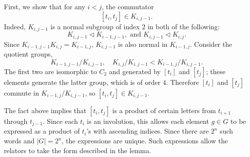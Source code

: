 \documentclass[12pt,leqno]{amsart}
\makeatletter
\renewenvironment{proof}[1][\proofname]{%
	\par
	\pushQED{\qed}%
	\normalfont
	\topsep6\p@\@plus6\p@\relax
	\trivlist
	\item[\hskip\labelsep\itshape #1\@addpunct{.}]%
	\ignorespaces
}{%
	\par\nobreak\vspace{2pt}%
	\popQED%
	\medskip%
	\endtrivlist
	\@endpefalse
}
\newcommand{\2}{L^2_{\rm per}(0, T)}
\numberwithin{equation}{section}
\numberwithin{figure}{section}
\makeatother
\begin{document}
\begin{proof}
    First, we show that for any $i<j$, the commutator
    \[
    [t_i,t_j]\in K_{i,j-1}.
    \]
    Indeed, $K_{i,j-1}$ is a normal subgroup of index $2$ in both of the following:
    \[
    K_{i,j-1}\vartriangleleft K_{i-1,j-1},\text{ and }K_{i,j-1}\vartriangleleft K_{i,j}.
    \]
    Since $K_{i-1,j-1}K_{i,j} = K_{i-1,j}$, $K_{i,j-1}$ is also normal in $K_{i-1,j}$. Consider the quotient groups,
    \[
    K_{i-1,j-1}/K_{i,j-1}, \quad K_{i,j}/K_{i,j-1}<K_{i-1,j}/K_{i,j-1}.
    \]
    The first two are isomorphic to $C_2$ and generated by $[t_i]$ and $[t_j]$; these elements generate the latter group, which is of order $4$. Therefore $[t_i]$ and $[t_j]$ commute in $K_{i-1,j}/K_{i,j-1}$, so $[t_i,t_j]\in K_{i,j-1}$.

    The fact above implies that $[t_i,t_j]$ is a product of certain letters from $t_{i+1}$ through $t_{j-1}$. Since each $t_i$ is an involution, this allows each element $g\in G$ to be expressed as a product of $t_i$'s with ascending indices. Since there are $2^n$ such words and $\lvert G\rvert = 2^n$, the expressions are unique. Such expressions allow the relators to take the form described in the lemma.
\end{proof}
\end{document}
